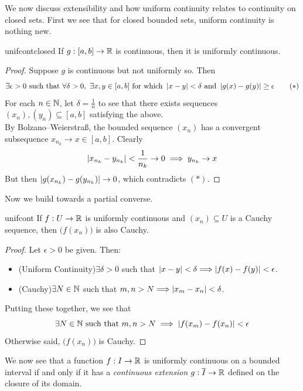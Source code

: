 We now discuss extensibility and how uniform continuity relates to continuity on closed sets. First we see that for closed bounded sets, uniform continuity is nothing new.

\begin{thm}{}{unifcontclosed}
	If $g:[a,b]\to\mathbb{R}$ is continuous, then it is uniformly continuous. 
\end{thm}

\begin{proof}
	Suppose $g$ is continuous but not uniformly so. Then
	\[
		\exists \epsilon>0\text{ such that }
		\forall\delta>0,\ \exists x,y\in [a,b]\text{ for which }
		\left| x-y\right|<\delta\text{ and }
		\left| g(x)-g(y)\right|\ge\epsilon \tag{$\ast$}
	\]
	For each $n\in\mathbb{N}$, let $\delta=\frac 1n$ to see that there exists sequences $(x_n),(y_n)\subseteq[a,b]$ satisfying the above.\\
	By Bolzano--Weierstraß, the bounded sequence $(x_n)$ has a convergent subsequence $x_{n_k}\to x\in[a,b]$. Clearly
	\[
		\left| x_{n_k}-y_{n_k}\right|<\frac 1{n_k}\to 0\implies y_{n_k}\to x
	\]
	But then $\left| g(x_{n_k})-g(y_{n_k})\right|\to 0$, which contradicts $(\ast)$.
\end{proof}

Now we build towards a partial converse.

\begin{lemm}{}{unifcont}
	If $f:U\to\mathbb{R}$ is uniformly continuous and $(x_n)\subseteq U$ is a Cauchy sequence, then $\bigl(f(x_n)\bigr)$ is also Cauchy.
\end{lemm}

\begin{proof}
	Let $\epsilon>0$ be given. Then:
	\begin{itemize}
	  \item (Uniform Continuity)\lstsp $\exists\delta>0$ such that $\left| x-y\right|<\delta\Longrightarrow \left| f(x)-f(y)\right|<\epsilon$.
	  \item (Cauchy)\lstsp $\exists N\in\mathbb{N}$ such that $m,n>N\Longrightarrow \left| x_m-x_n\right|<\delta$.
	\end{itemize}
	Putting these together, we see that
	\[
		\exists N\in\mathbb{N}\text{ such that }m,n>N
		\implies \left| f(x_m)-f(x_n)\right|<\epsilon
	\]
	Otherwise said, $\bigl(f(x_n)\bigr)$ is Cauchy.
\end{proof}
	
\goodbreak

We now see that a function $f:I\to \mathbb{R}$ is uniformly continuous on a bounded interval if and only if it has a \emph{continuous extension} $g:\overline{I}\to\mathbb{R}$ defined on the closure of its domain.

